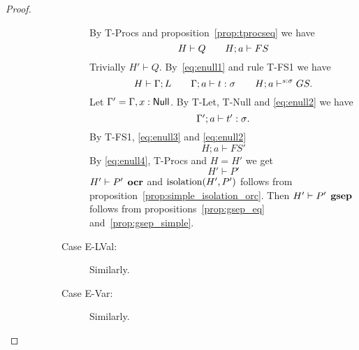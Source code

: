 \begin{proof}
\begin{description}
\begin{description}
\begin{description}
              By {\sc T-Procs} and proposition~\ref{prop:tprocseq} we have 
              \begin{equation} \label{eq:enull1}
               H \vdash Q  \quad\quad H; a \vdash FS 
              \end{equation}
              Trivially $H' \vdash Q$. 
              By~\eqref{eq:enull1} and rule {\sc T-FS1} we have
              \begin{equation} \label{eq:enull2}
                H \vdash \Gamma; L \quad\quad \mbox{$\Gamma;a\vdash t:\sigma$}
                \quad\quad H; a \vdash^{s: \sigma} GS.
              \end{equation}
              Let $\Gamma' = \Gamma, x: \mbox{$\mathsf{Null}$}$. By {\sc T-Let}, {\sc
              T-Null} and \eqref{eq:enull2} we have
              \begin{equation} \label{eq:enull3}
                \mbox{$\Gamma';a\vdash t':\sigma$}.
              \end{equation}
              By {\sc T-FS1}, \eqref{eq:enull3} and \eqref{eq:enull2}
              \begin{equation}\label{eq:enull4}
                H;a \vdash FS'
              \end{equation}
              By \eqref{eq:enull4}, {\sc T-Procs} and $H = H'$ we get  
              \begin{equation}
                H' \vdash P'
              \end{equation}
              $H' \vdash P' \:\: \mbox{\bf ocr}$ and $\mbox{$\mathrm{isolation}$}{(H', P')}$ follows from
              proposition~\ref{prop:simple_isolation_orc}. Then $H' \vdash P'
              \:\: \mbox{\bf gsep}$ follows from propositions~\ref{prop:gsep_eq}
              and~\ref{prop:gsep_simple}.
            \item[Case {\sc E-LVal}:] Similarly.
            \item[Case {\sc E-Var}:] Similarly.
          \end{description}
      \end{description}
  \end{description}
\end{proof}











